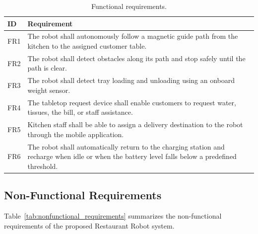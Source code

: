 \documentclass[12pt,a4paper]{article}
\begin{document}
\begin{table}[H]
\centering
\caption{Functional requirements.}
\label{tab:functional_requirements}
\renewcommand{\arraystretch}{1.2}
\begin{tabular}{@{}p{1.2cm}p{11.3cm}@{}}
\toprule
\textbf{ID} & \textbf{Requirement} \\
\midrule
FR1 & The robot shall autonomously follow a magnetic guide path from the kitchen to the assigned customer table. \\

FR2 & The robot shall detect obstacles along its path and stop safely until the path is clear. \\

FR3 & The robot shall detect tray loading and unloading using an onboard weight sensor. \\

FR4 & The tabletop request device shall enable customers to request water, tissues, the bill, or staff assistance. \\

FR5 & Kitchen staff shall be able to assign a delivery destination to the robot through the mobile application. \\

FR6 & The robot shall automatically return to the charging station and recharge when idle or when the battery level falls below a predefined threshold. \\
\bottomrule
\end{tabular}
\end{table}

\subsection{Non-Functional Requirements}

Table~\ref{tab:nonfunctional_requirements} summarizes the non-functional
requirements of the proposed Restaurant Robot system.
\end{document}
